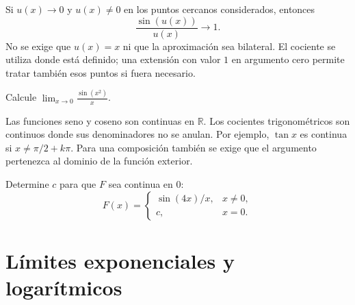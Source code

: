 \documentclass[10pt,a5paper]{article}
\newif\ifmostrarSoluciones
\begin{document}
\begin{criterio}
Si $u(x)\to0$ y $u(x)\neq0$ en los puntos cercanos considerados, entonces
\[
  \frac{\sin(u(x))}{u(x)}\longrightarrow1.
\]
No se exige que $u(x)=x$ ni que la aproximación sea bilateral. El cociente se utiliza donde está definido; una extensión con valor $1$ en argumento cero permite tratar también esos puntos si fuera necesario.
\end{criterio}

\begin{ejemplo}
Calcule $\displaystyle\lim_{x\to0}\frac{\sin(x^2)}{x}$.
\end{ejemplo}
\ifmostrarSoluciones
\begin{solucion}
Para $x\neq0$,
\[
  \frac{\sin(x^2)}{x}=x\frac{\sin(x^2)}{x^2}.
\]
Con $t=x^2$, $t\to0^+$ y el segundo factor tiende a $1$. El primero tiende a $0$, así que el límite es $0$. Se debe conservar el factor $x$ que aparece al ajustar el denominador.
\end{solucion}
\else\vspace{18mm}\fi

Las funciones seno y coseno son continuas en $\mathbb{R}$. Los cocientes trigonométricos son continuos donde sus denominadores no se anulan. Por ejemplo, $\tan x$ es continua si $x\neq\pi/2+k\pi$. Para una composición también se exige que el argumento pertenezca al dominio de la función exterior.

\begin{ejemplo}
Determine $c$ para que $F$ sea continua en $0$:
\[
  F(x)=\begin{cases}\sin(4x)/x,&x\neq0,\\c,&x=0.\end{cases}
\]
\end{ejemplo}
\ifmostrarSoluciones
\begin{solucion}
Para $x\neq0$, $\sin(4x)/x=4\sin(4x)/(4x)$, cuyo límite es $4$. La continuidad exige $F(0)=4$, de modo que $c=4$.
\end{solucion}
\else\vspace{16mm}\fi

\section*{Límites exponenciales y logarítmicos}
\end{document}
